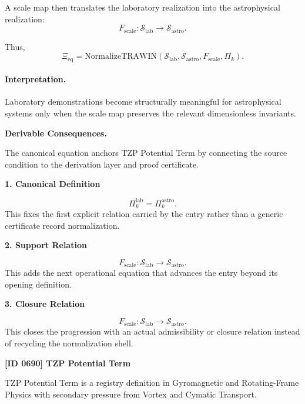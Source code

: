 A scale map then translates the laboratory realization into the astrophysical realization:
\begin{equation}
F_{\mathrm{scale}}:
\mathcal{S}_{\mathrm{lab}}
\to
\mathcal{S}_{\mathrm{astro}} .
\end{equation}

Thus,
\begin{equation}
\boxed{
\Xi_{\mathrm{eq}}
=
\mathrm{NormalizeTRAWIN}
\left(
\mathcal{S}_{\mathrm{lab}},
\mathcal{S}_{\mathrm{astro}},
F_{\mathrm{scale}},
\Pi_k
\right).
}
\end{equation}

\paragraph{Interpretation.}
Laboratory demonstrations become structurally meaningful for astrophysical systems only when the scale map preserves the relevant dimensionless invariants.

\par\vspace{0.35em}
\noindent\textbf{Derivable Consequences.}\quad
\begingroup
\footnotesize
\raggedright
The canonical equation anchors TZP Potential Term by connecting the source condition to the derivation layer and proof certificate.
\par\endgroup

\noindent\textbf{1. Canonical Definition}\par
\[
\Pi_k^{\mathrm{lab}} = \Pi_k^{\mathrm{astro}}.
\]
\noindent This fixes the first explicit relation carried by the entry rather than a generic certificate record normalization.\par
\noindent\textbf{2. Support Relation}\par
\[
F_{\mathrm{scale}}: \mathcal{S}_{\mathrm{lab}} \longrightarrow \mathcal{S}_{\mathrm{astro}}.
\]
\noindent This adds the next operational equation that advances the entry beyond its opening definition.\par
\noindent\textbf{3. Closure Relation}\par
\[
F_{\mathrm{scale}}: \mathcal{S}_{\mathrm{lab}} \to \mathcal{S}_{\mathrm{astro}}.
\]
\noindent This closes the progression with an actual admissibility or closure relation instead of recycling the normalization shell.\par

\clearpage
\noindent\textbf{[ID 0690] TZP Potential Term}\par
\vspace{0.35em}
\begingroup\small
{}
TZP Potential Term is a registry definition in Gyromagnetic and Rotating-Frame Physics with secondary pressure from Vortex and Cymatic Transport.


